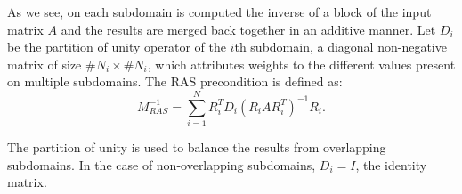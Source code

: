 As we see, on each subdomain is computed the inverse of a block of the input matrix \(A\) and the results are merged back together in an additive manner.
Let \(D_i\) be the partition of unity operator of the \(i\)th subdomain, a diagonal non-negative matrix of size \(\#N_i \times \#N_i\), which attributes weights to the different values present on multiple subdomains.
The RAS precondition is defined as:
\[M^{-1}_{RAS} = \sum^N_{i=1} R_i^T D_i (R_i A R_i^T)^{-1} R_i.\]

The partition of unity is used to balance the results from overlapping subdomains.
In the case of non-overlapping subdomains, \(D_i = I\), the identity matrix.

